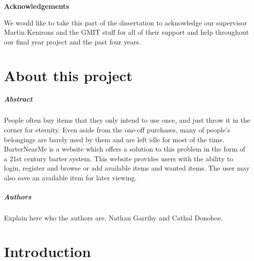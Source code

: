 \begin{titlepage}
   \begin{center}
       \vspace*{1cm}

       \textbf{Acknowledgements}
       \end{center}
       We would like to take this part of the dissertation to acknowledge our supervisor Martin Kenirons and the GMIT staff for all of their support and help throughout our final year project and the past four years.
\end{titlepage}

\chapter*{About this project}
\paragraph{Abstract}
People often buy items that they only intend to use once, and just throw it in the corner for eternity. Even aside from the one-off purchases, many of people's belongings are barely used by them and are left idle for most of the time. BarterNearMe is a website which offers a solution to this problem in the form of a 21st century barter system. This website provides users with the ability to login, register and browse or add available items and wanted items. The user may also save an available item for later viewing. 

\paragraph{Authors}
Explain here who the authors are. Nathan Garrihy and Cathal Donohoe.



\chapter{Introduction}


